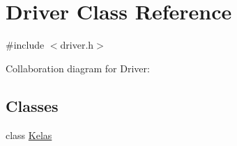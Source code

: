 \hypertarget{classDriver}{}\section{Driver Class Reference}
\label{classDriver}


{\ttfamily \#include $<$driver.\+h$>$}



Collaboration diagram for Driver\+:
\subsection*{Classes}
\begin{DoxyCompactItemize}
\item 
class \hyperlink{classDriver_1_1Kelas}{Kelas}
\end{DoxyCompactItemize}
